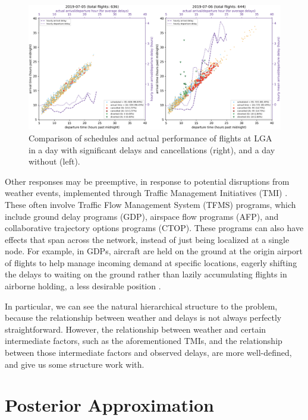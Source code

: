 \begin{figure}[htb!]
    \centering
    \includegraphics[width=\linewidth]{media/delay-comparison.png}
    \caption{Comparison of schedules and actual performance of flights at LGA in a day with significant delays and cancellations (right), and a day without (left). }
    \label{fig:delay-comparison}
\end{figure}

Other responses may be preemptive, in response to potential disruptions from weather events, implemented through Traffic Management Initiatives (TMI) \cite{jones_risk-adjusted_2023}. These often involve Traffic Flow Management System (TFMS) programs, which include ground delay programs (GDP), airspace flow programs (AFP), and collaborative trajectory options programs (CTOP). These programs can also have effects that span across the network, instead of just being localized at a single node. For example, in GDPs, aircraft are held on the ground at the origin airport of flights to help manage incoming demand at specific locations, eagerly shifting the delays to waiting on the ground rather than lazily accumulating flights in airborne holding, a less desirable position \cite{faa_tmi_2024}.

In particular, we can see the natural hierarchical structure to the problem, because the relationship between weather and delays is not always perfectly straightforward. However, the relationship between weather and certain intermediate factors, such as the aforementioned TMIs, and the relationship between those intermediate factors and observed delays, are more well-defined, and give us some structure work with.


\section{Posterior Approximation}
\label{background-approximate-inference}

